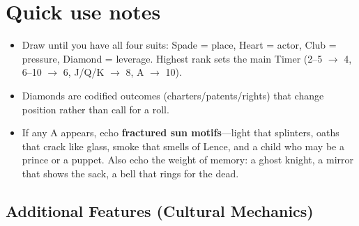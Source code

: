 \section*{Quick use notes}
\label{sec:vhasia-quick-use}
\begin{itemize}
\item Draw until you have all four suits: Spade = place, Heart = actor, Club = pressure, Diamond = leverage. Highest rank sets the main Timer (2--5 $\rightarrow$ 4, 6--10 $\rightarrow$ 6, J/Q/K $\rightarrow$ 8, A $\rightarrow$ 10).
\item Diamonds are codified outcomes (charters/patents/rights) that change position rather than call for a roll.
\item If any A appears, echo \textbf{fractured sun motifs}---light that splinters, oaths that crack like glass, smoke that smells of Lence, and a child who may be a prince or a puppet. Also echo the weight of memory: a ghost knight, a mirror that shows the sack, a bell that rings for the dead.
\end{itemize}

\subsection*{Additional Features (Cultural Mechanics)}
\label{sec:vhasia-mechanics}

